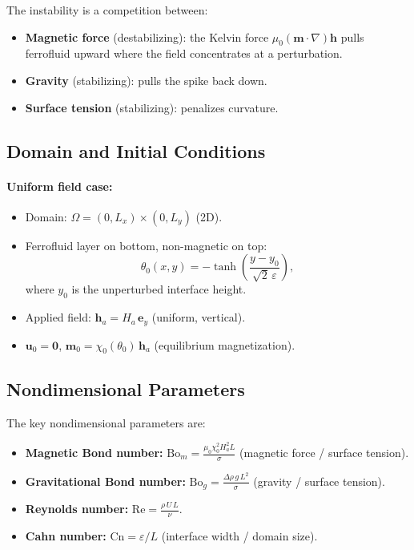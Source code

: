 \documentclass[11pt,a4paper]{article}
\theoremstyle{definition}
\theoremstyle{remark}
\newcommand{\grad}{\nabla}
\newcommand{\eps}{\varepsilon}
\newcommand{\bfu}{\bm{u}}
\newcommand{\bfm}{\bm{m}}
\newcommand{\bfh}{\bm{h}}
\begin{document}
The instability is a competition between:
\begin{itemize}
  \item \textbf{Magnetic force} (destabilizing): the Kelvin force
        $\mu_0(\bfm\cdot\grad)\bfh$ pulls ferrofluid upward where the
        field concentrates at a perturbation.
  \item \textbf{Gravity} (stabilizing): pulls the spike back down.
  \item \textbf{Surface tension} (stabilizing): penalizes curvature.
\end{itemize}

\subsection{Domain and Initial Conditions}

\paragraph{Uniform field case:}
\begin{itemize}[nosep]
  \item Domain: $\Omega = (0, L_x) \times (0, L_y)$ (2D).
  \item Ferrofluid layer on bottom, non-magnetic on top:
    \[
      \theta_0(x, y) = -\tanh\!\left(\frac{y - y_0}{\sqrt{2}\,\eps}\right),
    \]
    where $y_0$ is the unperturbed interface height.
  \item Applied field: $\bfh_a = H_a\,\bm{e}_y$ (uniform, vertical).
  \item $\bfu_0 = \bm{0}$, $\bfm_0 = \chi_0(\theta_0)\,\bfh_a$
    (equilibrium magnetization).
\end{itemize}

\subsection{Nondimensional Parameters}

The key nondimensional parameters are:
\begin{itemize}
  \item \textbf{Magnetic Bond number:}
    $\mathrm{Bo}_m = \frac{\mu_0 \chi_0^2 H_a^2 L}{\sigma}$
    (magnetic force / surface tension).
  \item \textbf{Gravitational Bond number:}
    $\mathrm{Bo}_g = \frac{\Delta\rho\,g\,L^2}{\sigma}$
    (gravity / surface tension).
  \item \textbf{Reynolds number:}
    $\mathrm{Re} = \frac{\rho\,U\,L}{\nu}$.
  \item \textbf{Cahn number:}
    $\mathrm{Cn} = \eps / L$ (interface width / domain size).
\end{itemize}
\end{document}
